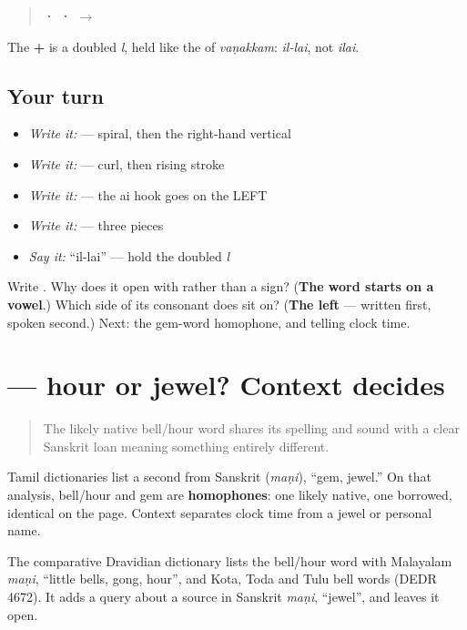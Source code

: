 \begin{quote}
\textbf{ ·  ·  $\to$ }
\end{quote}

The \textbf{ + } is a doubled \emph{l}, held like the \textbf{} of \emph{vaṇakkam}: \emph{il-lai}, not \emph{ilai}.

\subsection*{Your turn}
\begin{itemize}
\raggedright
  \item \emph{Write it:} \textbf{} — spiral, then the right-hand vertical
  \item \emph{Write it:} \textbf{} — curl, then rising stroke
  \item \emph{Write it:} \textbf{} — the ai hook goes on the LEFT
  \item \emph{Write it:} \textbf{} — three pieces
  \item \emph{Say it:} \textquotedblleft{}il-lai\textquotedblright{} — hold the doubled \emph{l}
\end{itemize}

\begin{tcolorbox}[breakable,colback=teal!4,colframe=teal!35!black,title={Before you move on}]
Write \textbf{}. Why does it open with \textbf{} rather than a sign? (\textbf{The word starts on a vowel}.) Which side of its consonant does \textbf{} sit on? (\textbf{The left} — written first, spoken second.) Next: the gem-word homophone, and telling clock time.
\end{tcolorbox}
\section[\texorpdfstring{\ta{மணி} / \ta{மணி} (maṇi / maṇi)}{மணி / மணி (maṇi / maṇi)}]{ — hour or jewel? Context decides}

\label{lesson:TA-C18-mani-homophone-time}



\begin{quote}
The likely native bell/hour word shares its spelling and sound with a clear Sanskrit loan meaning something entirely different.
\end{quote}

\begin{cousinweb}
Tamil dictionaries list a second \textbf{} from Sanskrit \textbf{} (\emph{maṇi}), \textquotedblleft{}gem, jewel.\textquotedblright{} On that analysis, bell/hour and gem are \textbf{homophones}: one likely native, one borrowed, identical on the page. Context separates clock time from a jewel or personal name.

The comparative Dravidian dictionary lists the bell/hour word with Malayalam \emph{maṇi}, \textquotedblleft{}little bells, gong, hour\textquotedblright{}, and Kota, Toda and Tulu bell words (DEDR 4672). It adds a query about a source in Sanskrit \emph{maṇi}, \textquotedblleft{}jewel\textquotedblright{}, and leaves it open.
\end{cousinweb}


